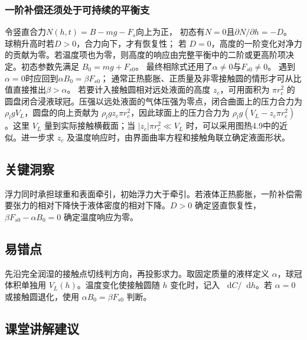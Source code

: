 \documentclass[UTF8,fontset=fandol,a4paper,11pt]{ctexart}
\newcommand{\dd}{\mathop{}\!\mathrm{d}}
\begin{document}
\subsubsection*{一阶补偿还须处于可持续的平衡支}
令竖直合力$N(h,t)=B-mg-F_s$向上为正，
初态有$N=0$且$\partial N/\partial h=-D$。
球稍升高时若$D>0$，合力向下，才有恢复性；
若 $D=0$，高度的一阶变化对净力的贡献为零。若温度项也为零，则高度的响应由完整平衡中的二阶或更高阶项决定。初态参数先满足 $B_0=mg+F_{s0}$。
最终相除式还用了$\alpha\ne0$与$F_{s0}\ne0$。
遇到$\alpha=0$时应回到$\alpha B_0=\beta F_{s0}$；
通常正热膨胀、正质量及非零接触圆的情形才可从比值直接推出$\beta>\alpha$。
若要计入接触圆相对远处液面的高度 $z_c$，可用面积为 $\pi r_c^2$ 的圆盘闭合浸液球冠。压强以远处液面的气体压强为零点，闭合曲面上的压力合力为 $\rho_lgV_L$，圆盘的向上贡献为 $\rho_lg z_c\pi r_c^2$，因此球面上的压力合力为 $\rho_lg(V_L-z_c\pi r_c^2)$。这里 $V_L$ 量到实际接触横截面；当 $|z_c|\pi r_c^2\ll V_L$ 时，可以采用图热4.9中的近似。进一步求 $z_c$ 及温度响应时，由界面曲率方程和接触角联立确定液面形状。




\subsection*{关键洞察}

浮力同时承担球重和表面牵引，初始浮力大于牵引。若液体正热膨胀，一阶补偿需要张力的相对下降快于液体密度的相对下降。$D>0$ 确定竖直恢复性，$\beta F_{s0}-\alpha B_0=0$ 确定温度响应为零。



\subsection*{易错点}

先沿完全润湿的接触点切线判方向，再投影求力。取固定质量的液样定义 $\alpha$，球冠体积单独用 $V_L(h)$。温度变化使接触圆随 $h$ 变化时，记入 $\dd C/\dd h$。若 $\alpha=0$ 或接触圆退化，使用 $\alpha B_0=\beta F_{s0}$ 判断。



\subsection*{课堂讲解建议}
\end{document}
